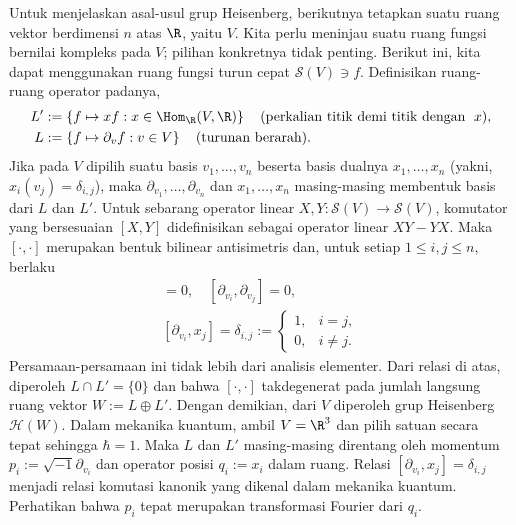 \begin{example}
	Untuk menjelaskan asal-usul grup Heisenberg, berikutnya tetapkan suatu ruang vektor berdimensi $n$ atas $\R$, yaitu $V$. Kita perlu meninjau suatu ruang fungsi bernilai kompleks pada $V$; pilihan konkretnya tidak penting. Berikut ini, kita dapat menggunakan ruang fungsi turun cepat $\mathscr{S}(V) \ni f$. Definisikan ruang-ruang operator padanya,
	\begin{align*}
		L' & := \left\{ f \mapsto xf : x \in \Hom_\R(V, \R) \right\} \quad (\text{perkalian titik demi titik dengan }\; x), \\
		L & := \left\{ f \mapsto \partial_v f : v \in V \right\} \quad (\text{turunan berarah}).
	\end{align*}
	Jika pada $V$ dipilih suatu basis $v_1, \ldots, v_n$ beserta basis dualnya $x_1, \ldots, x_n$ (yakni, $x_i(v_j) = \delta_{i,j}$), maka $\partial_{v_1}, \ldots, \partial_{v_n}$ dan $x_1, \ldots, x_n$ masing-masing membentuk basis dari $L$ dan $L'$. Untuk sebarang operator linear $X, Y: \mathscr{S}(V) \to \mathscr{S}(V)$, komutator yang bersesuaian $[X, Y]$ didefinisikan sebagai operator linear $XY - YX$. Maka $[\cdot, \cdot]$ merupakan bentuk bilinear antisimetris dan, untuk setiap $1 \leq i,j \leq n$, berlaku
	\begin{gather*}
		[x_i, x_j] = 0, \quad [\partial_{v_i}, \partial_{v_j}] = 0, \\
		[\partial_{v_i}, x_j] = \delta_{i,j} := \begin{cases} 1, & i=j, \\ 0, & i \neq j.  \end{cases}
	\end{gather*}
	Persamaan-persamaan ini tidak lebih dari analisis elementer. Dari relasi di atas, diperoleh $L \cap L' = \{0\}$ dan bahwa $[\cdot, \cdot]$ takdegenerat pada jumlah langsung ruang vektor $W := L \oplus L'$. Dengan demikian, dari $V$ diperoleh grup Heisenberg $\mathcal{H}(W)$. Dalam mekanika kuantum, ambil $V=\R^3$ dan pilih satuan secara tepat sehingga $\hbar=1$. Maka $L$ dan $L'$ masing-masing direntang oleh momentum $p_i := \sqrt{-1}\partial_{v_i}$ dan operator posisi $q_i := x_i$ dalam ruang. Relasi $[\partial_{v_i}, x_j] = \delta_{i,j}$ menjadi relasi komutasi kanonik yang dikenal dalam mekanika kuantum. Perhatikan bahwa $p_i$ tepat merupakan transformasi Fourier dari $q_i$.
\end{example}
